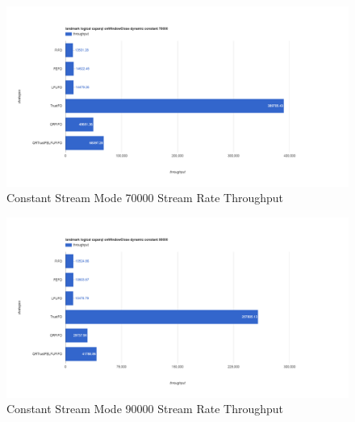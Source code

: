 \begin{figure}[!htbp]
    \centering
    \includegraphics[width=\textwidth]{img/app3-c-70000-t.png}
    \caption{Constant Stream Mode 70000 Stream Rate Throughput}
\end{figure}
\begin{figure}[!htbp]
    \centering
    \includegraphics[width=\textwidth]{img/app3-c-90000-t.png}
    \caption{Constant Stream Mode 90000 Stream Rate Throughput}
\end{figure}